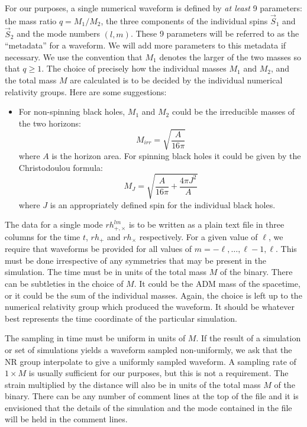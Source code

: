 \documentclass{article}
\numberwithin{equation}{section}
\begin{document}
For our purposes, a single numerical waveform is defined by \emph{at
  least} 9 parameters: the mass ratio $q = M_1/M_2$, the three
components of the individual spins $\vec{S}_1$ and $\vec{S}_2$ and the
mode numbers $(l,m)$.  These 9 parameters will be referred to as the
``metadata'' for a waveform.  We will add more parameters to this
metadata if necessary. We use the convention that $M_1$ denotes the
larger of the two masses so that $q\geq 1$.  The choice of precisely
how the individual masses $M_1$ and $M_2$, and the total mass $M$ are
calculated is to be decided by the individual numerical relativity
groups. Here are some suggestions:
\begin{itemize}
\item For non-spinning black holes, $M_1$ and $M_2$ could be the
irreducible masses of the two horizons:
\begin{equation}
  \label{eq:12}
  M_{irr} = \sqrt{\frac{A}{16\pi}}
\end{equation}
where $A$ is the horizon area.  For spinning black holes it could be
given by the Christodoulou formula:
\begin{equation}
  \label{eq:13}
  M_{J} = \sqrt{\frac{A}{16\pi} + \frac{4\pi J^2}{A}}
\end{equation}
where $J$ is an appropriately defined spin for the individual black
holes.
\end{itemize}

The data for a single mode $rh_{+,\times}^{lm}$ is to be written as a
plain text file in three columns for the time $t$, $rh_+$ and
$rh_\times$ respectively.  For a given value of $\ell$, we require
that waveforms be provided for all values of
$m=-\ell,\ldots,\ell-1,\ell$.  This must be done irrespective of any
symmetries that may be present in the simulation.  The time must be in
units of the total mass $M$ of the binary.  There can be subtleties in
the choice of $M$.  It could be the ADM mass of the spacetime, or it
could be the sum of the individual masses.  Again, the choice is left
up to the numerical relativity group which produced the waveform.  It
should be whatever best represents the time coordinate of the
particular simulation.

The sampling in time must be uniform in units of $M$.  If the result
of a simulation or set of simulations yields a waveform sampled
non-uniformly, we ask that the NR group interpolate to give a
uniformly sampled waveform.  A sampling rate of $1\times M$ is usually
sufficient for our purposes, but this is not a requirement.  The
strain multiplied by the distance will also be in units of the total
mass $M$ of the binary.  There can be any number of comment lines at
the top of the file and it is envisioned that the details of the
simulation and the mode contained in the file will be held in the
comment lines.  
\end{document}
